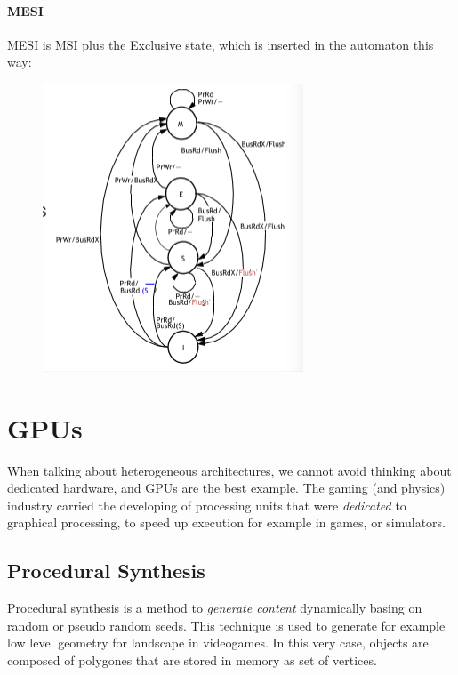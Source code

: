 \documentclass[10pt,a4paper]{article}
\begin{document}
					\paragraph{MESI}
						MESI is MSI plus the Exclusive state, which is inserted in the automaton this way:
						\begin{figure}[H]
							\centering
							\includegraphics[width = \textwidth]{./images/MESI.png}
						\end{figure}
				
		\section{GPUs}
			When talking about heterogeneous architectures, we cannot avoid thinking about dedicated hardware, and GPUs are the best example. The gaming (and physics) industry carried the developing of processing units that were \emph{dedicated} to graphical processing, to speed up execution for example in games, or simulators.
			
			\subsection{Procedural Synthesis}
				Procedural synthesis is a method to \emph{generate content} dynamically basing on random or pseudo random seeds. This technique is used to generate for example low level geometry for landscape in videogames. In this very case, objects are composed of polygones that are stored in memory as set of vertices.
				
\end{document}
